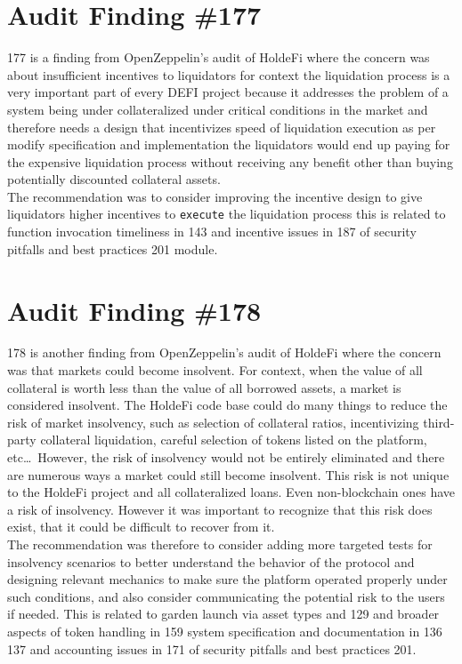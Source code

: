 \section{Audit Finding \#177}

177 is a finding from OpenZeppelin's audit of HoldeFi where the concern was about insufficient incentives to liquidators for context the liquidation process is a very important part of every DEFI project because it addresses the problem of a system being under collateralized under critical conditions in the market and therefore needs a design that incentivizes speed of liquidation execution as per modify specification and implementation the liquidators would end up paying for the expensive liquidation process without receiving any benefit other than buying potentially discounted collateral assets.\\ The recommendation was to consider improving the incentive design to give liquidators higher incentives to \verb|execute| the liquidation process this is related to function invocation timeliness in 143 and incentive issues in 187 of security pitfalls and best practices 201 module.

\section{Audit Finding \#178}

178 is another finding from OpenZeppelin's audit of HoldeFi where the concern was that markets could become insolvent. For context, when the value of all collateral is worth less than the value of all borrowed assets, a market is considered insolvent. The HoldeFi code base could do many things to reduce the risk of market insolvency, such as selection of collateral ratios, incentivizing third-party collateral liquidation, careful selection of tokens listed on the platform, etc\dots\, However, the risk of insolvency would not be entirely eliminated and there are numerous ways a market could still become insolvent. This risk is not unique to the HoldeFi project and all collateralized loans. Even non-blockchain ones have a risk of insolvency. However it was important to recognize that this risk does exist, that it could be difficult to recover from it.\\

The recommendation was therefore to consider adding more targeted tests for insolvency scenarios to better understand the behavior of the protocol and designing relevant mechanics to make sure the platform operated properly under such conditions, and also consider communicating the potential risk to the users if needed. This is related to garden launch via asset types and 129 and broader aspects of token handling in 159 system specification and documentation in 136 137 and accounting issues in 171 of security pitfalls and best practices 201.

